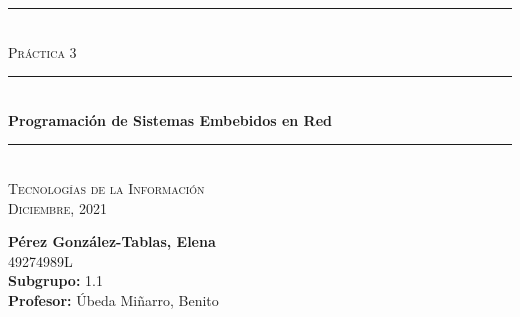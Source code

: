 \begin{titlepage}
	\begin{center}
		\rule{15cm}{0pt} \\
		[3cm]
		\textsc{\Large Práctica 3} \\
		\rule{15cm}{1pt} \\
		[0.25cm]
		\huge{\bfseries Programación de Sistemas Embebidos en Red} \\
		\rule{15cm}{1pt} \\
		\textsc{\Large Tecnologías de la Información} \\
		[0.25cm]
		\textsc{\Large Diciembre, 2021}\\
		[9cm]
	\end{center}
	\begin{flushright}
		\textbf{Pérez González-Tablas, Elena} \\
		[0.25cm]
		49274989L \\
		[0.25cm]
		\textbf{Subgrupo:} 1.1 \\
		[0.25cm]
		\textbf{Profesor:} Úbeda Miñarro, Benito\\
	\end{flushright}
\end{titlepage}
\newpage
\begin{titlepage}
	\begin{flushleft}
	\end{flushleft}
\end{titlepage}